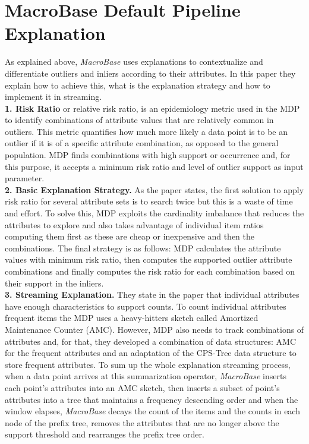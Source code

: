 \documentclass[11pt, titlepage]{article}
\begin{document}
	\section{MacroBase Default Pipeline Explanation}
		As explained above, \textit{MacroBase} uses explanations to contextualize and differentiate outliers and inliers according to their attributes. In this paper they explain how to achieve this,  what is the explanation strategy and how to implement it in streaming.
		\\\textbf{1. Risk Ratio} or relative risk ratio, is an epidemiology metric used in the MDP to identify combinations of attribute values that are relatively common in outliers. This metric quantifies how much more likely a data point is to be an outlier if it is of a specific attribute combination, as opposed to the general population. MDP finds combinations with high support or occurrence and, for this purpose, it accepts a minimum risk ratio and level of outlier support as input parameter.
		\\\textbf{2. Basic Explanation Strategy.} As the paper states, the first solution to apply risk ratio for several attribute sets is to search twice but this is a waste of time and effort. To solve this, MDP exploits the cardinality imbalance that reduces the attributes to explore and also takes advantage of individual item ratios computing them first as these are cheap or inexpensive and then the combinations. The final strategy is as follows: MDP calculates the attribute values with minimum risk ratio, then computes the supported outlier attribute combinations and finally computes the risk ratio for each combination based on their support in the inliers.
		\\\textbf{3. Streaming Explanation.} They state in the paper that individual attributes have enough characteristics to support counts. To count individual attributes frequent items the MDP uses a heavy-hitters sketch called Amortized Maintenance Counter (AMC). However, MDP also needs to track combinations of attributes and, for that, they developed a combination of data structures: AMC for the frequent attributes and an adaptation of the CPS-Tree data structure to store frequent attributes. To sum up the whole explanation streaming process, when a data point arrives at this summarization operator, \textit{MacroBase} inserts each point's attributes into an AMC sketch, then inserts a subset of point's attributes into a tree that maintains a frequency descending order and when the window elapses, \textit{MacroBase} decays the count of the items and the counts in each node of the prefix tree, removes the attributes that are no longer above the support threshold and rearranges the prefix tree order.
\end{document}
